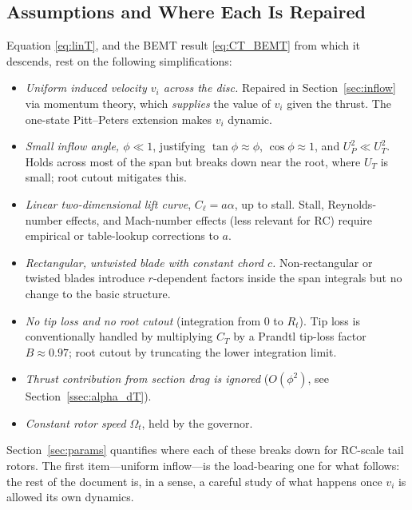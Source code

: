 \documentclass[11pt,a4paper]{article}
\newcommand{\OmegaT}{\Omega_t}
\newcommand{\Rt}{R_t}
\newcommand{\vi}{v_i}
\begin{document}
\subsection{Assumptions and Where Each Is Repaired}\label{ssec:bemt_assumptions}

Equation \eqref{eq:linT}, and the BEMT result \eqref{eq:CT_BEMT} from
which it descends, rest on the following simplifications:
\begin{itemize}[leftmargin=*,itemsep=2pt,topsep=2pt]
\item \emph{Uniform induced velocity \(\vi\) across the disc.}
      Repaired in Section~\ref{sec:inflow} via momentum theory, which
      \emph{supplies} the value of \(\vi\) given the thrust. The
      one-state Pitt--Peters extension makes \(\vi\) dynamic.
\item \emph{Small inflow angle, \(\phi\ll 1\)}, justifying
      \(\tan\phi\approx\phi\), \(\cos\phi\approx 1\), and
      \(U_P^2\ll U_T^2\). Holds across most of the span but breaks
      down near the root, where \(U_T\) is small; root cutout
      mitigates this.
\item \emph{Linear two-dimensional lift curve}, \(C_\ell=a\alpha\),
      up to stall. Stall, Reynolds-number effects, and Mach-number
      effects (less relevant for RC) require empirical or
      table-lookup corrections to \(a\).
\item \emph{Rectangular, untwisted blade with constant chord \(c\).}
      Non-rectangular or twisted blades introduce \(r\)-dependent
      factors inside the span integrals but no change to the basic
      structure.
\item \emph{No tip loss and no root cutout} (integration from
      \(0\) to \(\Rt\)). Tip loss is conventionally handled by
      multiplying \(C_T\) by a Prandtl tip-loss factor
      \(B\approx 0.97\); root cutout by truncating the lower
      integration limit.
\item \emph{Thrust contribution from section drag is ignored}
      (\(O(\phi^2)\), see Section~\ref{ssec:alpha_dT}).
\item \emph{Constant rotor speed} \(\OmegaT\), held by the
      governor.
\end{itemize}
Section~\ref{sec:params} quantifies where each of these breaks down
for RC-scale tail rotors. The first item---uniform inflow---is the
load-bearing one for what follows: the rest of the document is, in a
sense, a careful study of what happens once \(\vi\) is allowed its
own dynamics.
\end{document}
